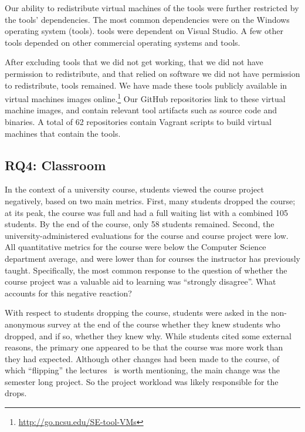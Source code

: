 \documentclass[10pt,conference]{IEEEtran}
\begin{document}
Our ability to redistribute virtual machines of the tools were
further restricted by the tools' dependencies.
The most common dependencies were on the Windows 
operating system (\depWindows tools).
\depVS tools were dependent on Visual Studio.
A few other tools depended on other commercial 
operating systems and tools.
 
After excluding tools 
that we did not get working,
that we did not have permission to redistribute, and 
that relied on software we did not have permission to redistribute,
\permissionToRedistribute tools remained.
We have made these tools publicly available in virtual machines 
images online.\footnote{\url{http://go.ncsu.edu/SE-tool-VMs}}
Our GitHub repositories link to these virtual machine images,
and contain relevant tool artifacts such as source code
and binaries.
A total of 62 repositories 
contain Vagrant scripts to build 
virtual machines that contain the tools. 

\subsection{RQ4: Classroom}

In the context of a university course,
students viewed the course project negatively,
based on two main metrics.
First, many students dropped the course; 
at its peak, the course was full and had a full
waiting list with a combined 105 students.
By the end of the course, only 58 students remained.
Second, the university-administered evaluations for
the course and course project were low.
All quantitative metrics for the course were below
the Computer Science department average, and were
lower than for courses the instructor has previously
taught.
Specifically, the most common response to the question
of whether the course project was a valuable aid to learning
was ``strongly disagree''.
What accounts for this negative reaction?

With respect to students dropping the course, students were asked
in the non-anonymous survey at the end of the course whether they knew
students who dropped, and if so, whether they knew why.
While students cited some external reasons, the 
primary one appeared to be that the course was more work
than they had expected.
Although other changes had been made to the course, 
of which ``flipping'' the lectures~\cite{flipped} is worth mentioning,
the main change was the semester long project. So the project workload
was likely responsible for the drops.
\end{document}
